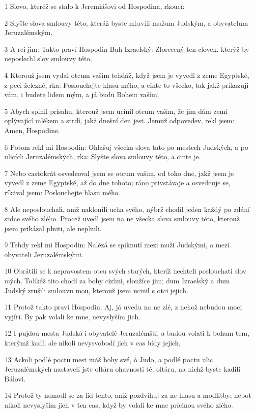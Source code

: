 \par 1 Slovo, kteréž se stalo k Jeremiášovi od Hospodina, rkoucí:
\par 2 Slyšte slova smlouvy této, kteráž byste mluvili mužum Judským, a obyvatelum Jeruzalémským,
\par 3 A rci jim: Takto praví Hospodin Buh Izraelský: Zlorecený ten clovek, kterýž by neposlechl slov smlouvy této,
\par 4 Kterouž jsem vydal otcum vašim tehdáž, když jsem je vyvedl z zeme Egyptské, z peci železné, rka: Poslouchejte hlasu mého, a cinte to všecko, tak jakž prikazuji vám, i budete lidem mým, a já budu Bohem vaším,
\par 5 Abych splnil prísahu, kterouž jsem ucinil otcum vašim, že jim dám zemi oplývající mlékem a strdí, jakž dnešní den jest. Jemuž odpovedev, rekl jsem: Amen, Hospodine.
\par 6 Potom rekl mi Hospodin: Ohlašuj všecka slova tato po mestech Judských, a po ulicích Jeruzalémských, rka: Slyšte slova smlouvy této, a cinte je.
\par 7 Nebo castokrát osvedcoval jsem se otcum vašim, od toho dne, jakž jsem je vyvedl z zeme Egyptské, až do dne tohoto; ráno privstávaje a osvedcuje se, ríkával jsem: Poslouchejte hlasu mého.
\par 8 Ale neposlouchali, aniž naklonili ucha svého, nýbrž chodil jeden každý po zdání srdce svého zlého. Procež uvedl jsem na ne všecka slova smlouvy této, kterouž jsem prikázal plniti, ale neplnili.
\par 9 Tehdy rekl mi Hospodin: Nalézá se spiknutí mezi muži Judskými, a mezi obyvateli Jeruzalémskými.
\par 10 Obrátili se k nepravostem otcu svých starých, kteríž nechteli poslouchati slov mých. Tolikéž tito chodí za bohy cizími, sloužíce jim; dum Izraelský a dum Judský zrušili smlouvu mou, kterouž jsem ucinil s otci jejich.
\par 11 Protož takto praví Hospodin: Aj, já uvedu na ne zlé, z nehož nebudou moci vyjíti. By pak volali ke mne, nevyslyším jich.
\par 12 I pujdou mesta Judská i obyvatelé Jeruzalémští, a budou volati k bohum tem, kterýmž kadí, ale nikoli nevysvobodí jich v cas bídy jejich,
\par 13 Ackoli podlé poctu mest máš bohy své, ó Judo, a podlé poctu ulic Jeruzalémských nastaveli jste oltáru ohavnosti té, oltáru, na nichž byste kadili Bálovi.
\par 14 Protož ty nemodl se za lid tento, aniž pozdvihuj za ne hlasu a modlitby; nebot nikoli nevyslyším jich v ten cas, když by volali ke mne prícinou svého zlého.
